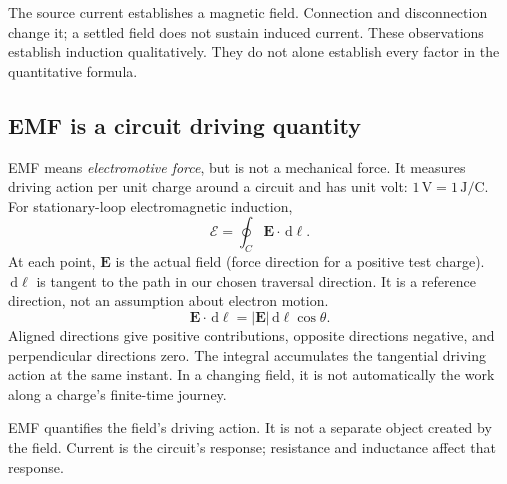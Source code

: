 \documentclass[11pt,letterpaper]{article}
\newcommand{\vect}[1]{\boldsymbol{#1}}
\newcommand{\dd}{\,\mathrm d}
\begin{document}
The source current establishes a magnetic field. Connection and disconnection change it; a settled field does not sustain induced current. These observations establish induction qualitatively. They do not alone establish every factor in the quantitative formula.\cite{faraday}

\subsection*{EMF is a circuit driving quantity}
EMF means \emph{electromotive force}, but is not a mechanical force. It measures driving action per unit charge around a circuit and has unit volt: $1\,\mathrm V=1\,\mathrm{J/C}$. For stationary-loop electromagnetic induction,
\begin{equation}
\boxed{\mathcal E=\oint_C\vect E\cdot\dd\vect\ell.}
\end{equation}
At each point, $\vect E$ is the actual field (force direction for a positive test charge). $\dd\vect\ell$ is tangent to the path in our chosen traversal direction. It is a reference direction, not an assumption about electron motion.
\[
\vect E\cdot\dd\vect\ell=|\vect E|\dd\ell\cos\theta.
\]
Aligned directions give positive contributions, opposite directions negative, and perpendicular directions zero. The integral accumulates the tangential driving action at the same instant. In a changing field, it is not automatically the work along a charge's finite-time journey.\cite{induction}

\begin{center}
\end{center}
EMF quantifies the field's driving action. It is not a separate object created by the field. Current is the circuit's response; resistance and inductance affect that response.

\newpage
\end{document}
